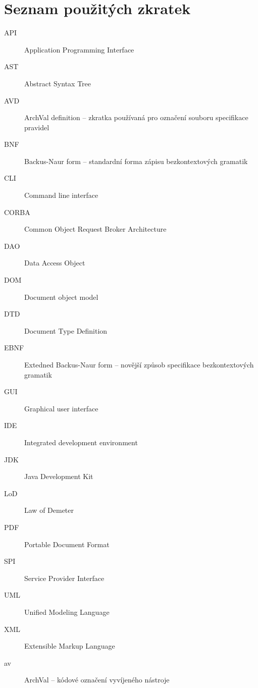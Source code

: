 \chapter{Seznam použitých zkratek}

\begin{description}
\item[API] Application Programming Interface
\item[AST] Abstract Syntax Tree
\item[AVD] ArchVal definition -- zkratka používaná pro označení souboru specifikace pravidel
\item[BNF] Backus-Naur form -- standardní forma zápisu bezkontextových gramatik
\item[CLI] Command line interface
\item[CORBA] Common Object Request Broker Architecture
\item[DAO] Data Access Object
\item[DOM] Document object model
\item[DTD] Document Type Definition
\item[EBNF] Extedned Backus-Naur form -- novější způsob specifikace bezkontextových gramatik
\item[GUI] Graphical user interface
\item[IDE] Integrated development environment
\item[JDK] Java Development Kit
\item[LoD] Law of Demeter
\item[PDF] Portable Document Format
\item[SPI] Service Provider Interface
\item[UML] Unified Modeling Language
\item[XML] Extensible Markup Language
\item[av] ArchVal -- kódové označení vyvíjeného nástroje
\end{description}
